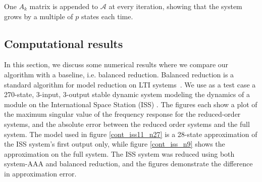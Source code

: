\documentclass[letterpaper, 10 pt, conference]{ieeeconf}  %
\newcommand{\mbb}[1]{\mathbb{#1}}
\newcommand{\mcal}[1]{\mathcal{#1}}
\begin{document}
\begin{remark} \label{rem_p}
        One \(A_k\) matrix is appended to \(\mcal{A}\) at every iteration, showing that the system grows by a multiple of \(p\) states each time. 
\end{remark}

\begin{comment}
\subsection{Summary}
\begin{enumerate}
    \item Let \(R_0 = D\), \(\ell = 1\). 
    \item Using an \(\mcal{H}_\infty\) bisection algorithm, find \(\omega_\ell\) such that 
    \[\omega_\ell = \arg\min_{\omega\in\real\geq 0} \norm{G(j\omega)-R_{\ell-1}(j\omega)}_2\]
    \item Construct the state space representation of \(H\) from (\ref{h_eq}) using (\ref{scrnm_eq}). 
    \item Use \(H\) to find \(X\) using (\ref{x_eq}) and (\ref{x_lyap}).
    \item Find the weight matrices \(\mbb{W}\) that solves the optimization problem in (\ref{opt_eq}) using theorem \ref{opt_thm} by choosing the rows of \(\mbb{W}\) to be the eigenvectors corresponding to the \(p\) smallest non-zero distinct eigenvalues of \(X\).  
    \item Create a state space representation of \(R_\ell\) with (\ref{rss_eq}). 
    \item Evaluate the resulting reduced order system and go back to step 2, setting \(i\leftarrow i+1\) if better results are desired.  
\end{enumerate}
\end{comment}

\subsection{Computational results}
In this section, we discuss some numerical results where we compare our algorithm with a baseline, i.e. balanced reduction.  Balanced reduction is a standard algorithm for model reduction on LTI systems~\cite{Zhou95}.  We use as a test case a 270-state, 3-input, 3-output stable dynamic system modeling the dynamics of a module on the International Space Station (ISS) \cite{iss_model}.   The figures each show a plot of the maximum singular value of the frequency response for the reduced-order systems, and the absolute error between the reduced order systems and the full system.  The model used in figure \ref{cont_iss11_n27} is a 28-state approximation of the ISS system's first output only, while figure \ref{cont_iss_n9} shows the approximation on the full system.  The ISS system was reduced using both system-AAA and balanced reduction, and the figures demonstrate the difference in approximation error. 
\end{document}
